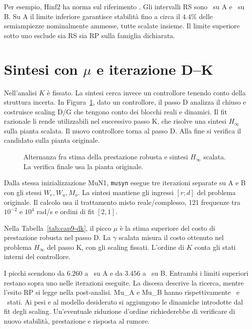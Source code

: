 Per esempio, Hinf2 ha norma sul riferimento \FinHinfTwoNormaR.
Gli intervalli RS sono \FinHinfTwoIntervalloRSA\ su A e
\FinHinfTwoIntervalloRSB\ su B. Su A il limite inferiore
garantisce stabilità fino a circa il $4.4\%$ delle semiampiezze
nominalmente ammesse, tutte scalate insieme. Il limite superiore
sotto uno esclude sia RS sia RP sulla famiglia dichiarata.

\section{Sintesi con \texorpdfstring{$\mu$}{mu} e iterazione D--K}

Nell'analisi $K$ è fissato. La sintesi cerca invece un controllore
tenendo conto della struttura incerta. In Figura~\ref{fig:cap9-dk},
dato un controllore, il passo D analizza il chiuso e costruisce
scaling D/G che tengono conto dei blocchi reali e dinamici. Il
fit razionale li rende utilizzabili nel successivo passo K, che
risolve una sintesi $H_\infty$ sulla pianta scalata. Il nuovo
controllore torna al passo D. Alla fine si verifica il candidato
sulla pianta originale.

\begin{figure}[!htb]\centering
\resizebox{.9\linewidth}{!}{}
\caption{Alternanza fra stima della prestazione robusta e sintesi
$H_\infty$ scalata. La verifica finale usa la pianta originale.}
\label{fig:cap9-dk}
\end{figure}

Dalla stessa inizializzazione MuN1, \texttt{musyn} esegue tre
iterazioni separate su A e B con gli stessi $W_e,W_u,M_o$.
La sintesi mantiene gli ingressi $[r;d]$ del problema originale.
Il calcolo usa il trattamento misto reale/complesso, 121 frequenze
tra $10^{-2}$ e $10^4$ rad/s e ordini di fit $[2,1]$.

Nella Tabella~\ref{tab:cap9-dk}, il picco $\mu$ è la stima superiore
del costo di prestazione robusta nel passo D. La $\gamma$ scalata
misura il costo ottenuto nel problema $H_\infty$ del passo K,
con gli scaling fissati. L'ordine di $K$ conta gli stati interni
del controllore.



I picchi scendono da $6.260$ a \FinDkA\ su A e da $3.456$ a
\FinDkB\ su B. Entrambi i limiti superiori restano sopra uno
nelle iterazioni eseguite. La discesa descrive la ricerca, mentre
l'esito RP si legge nella post-analisi. Mu\_A e Mu\_B hanno rispettivamente
\FinMuAOrdine\ e \FinMuBOrdine\ stati. Ai pesi e al modello
desiderato si aggiungono le dinamiche introdotte dal fit degli
scaling. Un'eventuale riduzione d'ordine richiederebbe di verificare
di nuovo stabilità, prestazione e risposta al rumore.

